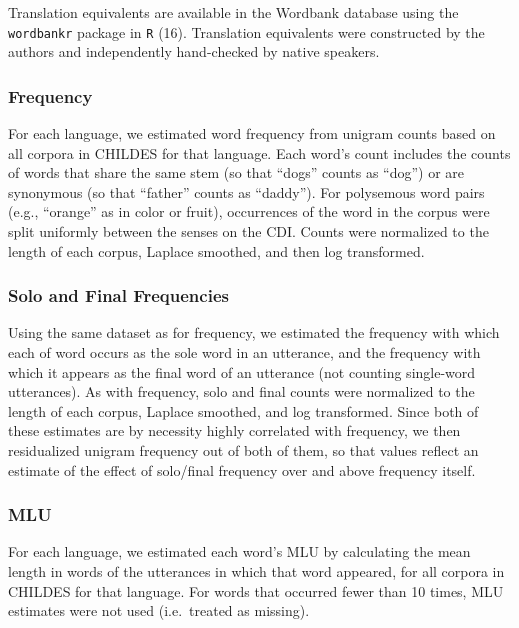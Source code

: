 \documentclass[english,man]{apa6}
\newcounter{author}
\theoremstyle{definition}
\theoremstyle{definition}
\theoremstyle{definition}
\theoremstyle{remark}
\begin{document}
Translation equivalents are available in the Wordbank database using the
\texttt{wordbankr} package in \texttt{R} (16). Translation equivalents
were constructed by the authors and independently hand-checked by native
speakers.

\subsubsection{Frequency}\label{frequency}

For each language, we estimated word frequency from unigram counts based
on all corpora in CHILDES for that language. Each word's count includes
the counts of words that share the same stem (so that \enquote{dogs}
counts as \enquote{dog}) or are synonymous (so that \enquote{father}
counts as \enquote{daddy}). For polysemous word pairs (e.g.,
\enquote{orange} as in color or fruit), occurrences of the word in the
corpus were split uniformly between the senses on the CDI. Counts were
normalized to the length of each corpus, Laplace smoothed, and then log
transformed.

\subsubsection{Solo and Final
Frequencies}\label{solo-and-final-frequencies}

Using the same dataset as for frequency, we estimated the frequency with
which each of word occurs as the sole word in an utterance, and the
frequency with which it appears as the final word of an utterance (not
counting single-word utterances). As with frequency, solo and final
counts were normalized to the length of each corpus, Laplace smoothed,
and log transformed. Since both of these estimates are by necessity
highly correlated with frequency, we then residualized unigram frequency
out of both of them, so that values reflect an estimate of the effect of
solo/final frequency over and above frequency itself.

\subsubsection{MLU}\label{mlu}

For each language, we estimated each word's MLU by calculating the mean
length in words of the utterances in which that word appeared, for all
corpora in CHILDES for that language. For words that occurred fewer than
10 times, MLU estimates were not used (i.e.~treated as missing).
\end{document}
